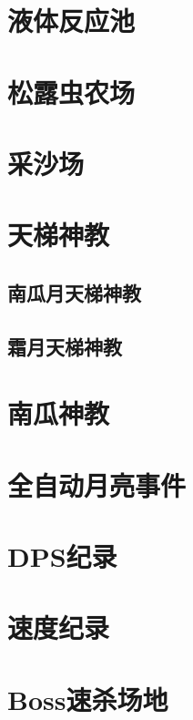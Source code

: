 \section{液体反应池}

\section{松露虫农场}

\section{采沙场}

\section{天梯神教}
\subsection{南瓜月天梯神教}
\subsection{霜月天梯神教}

\section{南瓜神教}

\section{全自动月亮事件}

\section{DPS纪录}

\section{速度纪录}

\section{Boss速杀场地}
